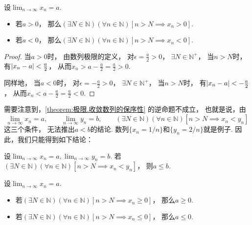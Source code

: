 \begin{corollary}[保号性]\label{theorem:极限.收敛数列的保号性}
设\(\lim_{n\to\infty}x_n = a\).
\begin{itemize}
	\item 若\(a > 0\)，
	那么\((\exists N\in\mathbb{N})
	(\forall n\in\mathbb{N})
	[n>N \implies x_n > 0]\).

	\item 若\(a < 0\)，
	那么\((\exists N\in\mathbb{N})
	(\forall n\in\mathbb{N})
	[n>N \implies x_n < 0]\).
\end{itemize}
\begin{proof}
当\(a > 0\)时，
由数列极限的定义，
对\(\epsilon = \frac{a}{2} > 0\)，
\(\exists N \in \mathbb{N}^+\)，
当\(n > N\)时，
有\(\abs{x_n - a} < \frac{a}{2}\)，
从而\(x_n > a - \frac{a}{2} = \frac{a}{2} > 0\).

同样地，
当\(a < 0\)时，
对\(\epsilon = -\frac{a}{2} > 0\)，
\(\exists N \in \mathbb{N}^+\)，
当\(n > N\)时，
有\(\abs{x_n - a} < -\frac{a}{2}\)，
从而\(x_n < a - \frac{a}{2} = \frac{a}{2} < 0\).
\end{proof}
\end{corollary}

需要注意到，\cref{theorem:极限.收敛数列的保序性} 的逆命题不成立，
也就是说，由\[
	\lim_{n\to\infty} x_n = a, \qquad
	\lim_{n\to\infty} y_n = b, \qquad
	(\exists N\in\mathbb{N})
	(\forall n\in\mathbb{N})
	[n>N \implies x_n < y_n]
\]这三个条件，
无法推出\(a<b\)的结论.
数列\(\{x_n = 1/n\}\)和\(\{y_n = 2/n\}\)就是例子.
因此，我们只能得到如下结论：
\begin{proposition}\label{theorem:极限.夹逼准则.引理}
设\(\lim_{n\to\infty} x_n = a,
\lim_{n\to\infty} y_n = b\).
若\((\exists N\in\mathbb{N})
(\forall n\in\mathbb{N})
[n>N \implies x_n < y_n]\)，
则\(a \leq b\).
\end{proposition}

\begin{corollary}
设\(\lim_{n\to\infty} x_n = a\).
\begin{itemize}
	\item 若\((\exists N\in\mathbb{N})
	(\forall n\in\mathbb{N})
	[n > N \implies x_n \geq 0]\)，
	那么\(a \geq 0\).

	\item 若\((\exists N\in\mathbb{N})
	(\forall n\in\mathbb{N})
	[n > N \implies x_n \leq 0]\)，
	那么\(a \leq 0\).
\end{itemize}
\end{corollary}

